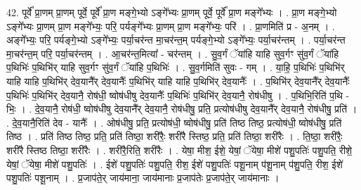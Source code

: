 \documentclass[17pt]{extarticle}
\begin{document}
42. पूर्वे᳚ प्रा॒णम् प्रा॒णम् पूर्वे॒ पूर्वे᳚ प्रा॒ण मङ्गे॒भ्यो ऽङ्गे᳚भ्यः प्रा॒णम् पूर्वे॒ पूर्वे᳚ प्रा॒ण मङ्गे᳚भ्यः । . प्रा॒ण मङ्गे॒भ्यो ऽङ्गे᳚भ्यः प्रा॒णम् प्रा॒ण मङ्गे᳚भ्यः॒ परि॒ पर्यङ्गे᳚भ्यः प्रा॒णम् प्रा॒ण मङ्गे᳚भ्यः॒ परि॑ । . प्रा॒णमिति॑ प्र - अ॒नम् । . अङ्गे᳚भ्यः॒ परि॒ पर्यङ्गे॒भ्यो ऽङ्गे᳚भ्यः॒ पर्या॒चर॑न्त मा॒चर॑न्त॒म् पर्यङ्गे॒भ्यो ऽङ्गे᳚भ्यः॒ पर्या॒चर॑न्तम् । . पर्या॒चर॑न्त मा॒चर॑न्त॒म् परि॒ पर्या॒चर॑न्तम् । . आ॒चर॑न्त॒मित्या᳚ - चर॑न्तम् । . सु॒व॒र्गं ॅया॑हि याहि सुव॒र्गꣳ सु॑व॒र्गं ॅया॑हि प॒थिभिः॑ प॒थिभि॑र् याहि सुव॒र्गꣳ सु॑व॒र्गं ॅया॑हि प॒थिभिः॑ । . सु॒व॒र्गमिति॑ सुवः - गम् । . या॒हि॒ प॒थिभिः॑ प॒थिभि॑र् याहि याहि प॒थिभि॑र् देव॒यानै᳚र् देव॒यानैः᳚ प॒थिभि॑र् याहि याहि प॒थिभि॑र् देव॒यानैः᳚ । . प॒थिभि॑र् देव॒यानै᳚र् देव॒यानैः᳚ प॒थिभिः॑ प॒थिभि॑र् देव॒यानै॒ रोष॑धी॒ ष्वोष॑धीषु देव॒यानैः᳚ प॒थिभिः॑ प॒थिभि॑र् देव॒यानै॒ रोष॑धीषु । . प॒थिभि॒रिति॑ प॒थि - भिः॒ । . दे॒व॒यानै॒ रोष॑धी॒ ष्वोष॑धीषु देव॒यानै᳚र् देव॒यानै॒ रोष॑धीषु॒ प्रति॒ प्रत्योष॑धीषु देव॒यानै᳚र् देव॒यानै॒ रोष॑धीषु॒ प्रति॑ । . दे॒व॒यानै॒रिति॑ देव - यानैः᳚ । . ओष॑धीषु॒ प्रति॒ प्रत्योष॑धी॒ ष्वोष॑धीषु॒ प्रति॑ तिष्ठ तिष्ठ॒ प्रत्योष॑धी॒ ष्वोष॑धीषु॒ प्रति॑ तिष्ठ । . प्रति॑ तिष्ठ तिष्ठ॒ प्रति॒ प्रति॑ तिष्ठा॒ शरी॑रैः॒ शरी॑रै स्तिष्ठ॒ प्रति॒ प्रति॑ तिष्ठा॒ शरी॑रैः । . ति॒ष्ठा॒ शरी॑रैः॒ शरी॑रै स्तिष्ठ तिष्ठा॒ शरी॑रैः । . शरी॑रै॒रिति॒ शरी॑रैः । . येषा॒ मीश॒ ईशे॒ येषां॒ ॅयेषा॒ मीशे॑ पशु॒पतिः॑ पशु॒पति॒ रीशे॒ येषां॒ ॅयेषा॒ मीशे॑ पशु॒पतिः॑ । . ईशे॑ पशु॒पतिः॑ पशु॒पति॒ रीश॒ ईशे॑ पशु॒पतिः॑ पशू॒नाम् प॑शू॒नाम् प॑शु॒पति॒ रीश॒ ईशे॑ पशु॒पतिः॑ पशू॒नाम् । . प्र॒जाप॑ते॒र् जाय॑माना॒ जाय॑मानाः प्र॒जाप॑तेः प्र॒जाप॑ते॒र् जाय॑मानाः । \newline
\end{document}
